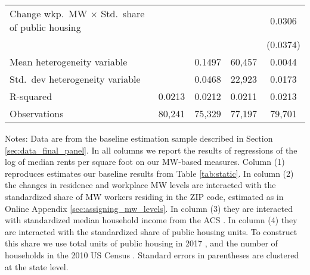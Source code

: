 \begin{table}[hbt!]
\begin{tabular}{@{}lcccc@{}}
        Change wkp.\ MW $\times$ Std.\ share of public housing &        &       &        &  0.0306   \\
                                                               &        &       &        & (0.0374)  \\ \midrule
        Mean heterogeneity variable                            &        & 0.1497   &  60,457  & 0.0044    \\
        Std.\ dev heterogeneity variable                       &        & 0.0468   &  22,923  & 0.0173    \\ \midrule
        R-squared                                              &  0.0213   &  0.0212  &  0.0211   &  0.0213   \\
        Observations                                           &  80,241  &  75,329 &  77,197  &  79,701  \\ \bottomrule
    \end{tabular}

    \begin{minipage}{.95\linewidth} \footnotesize
        \vspace{2mm}
        Notes: 
        Data are from the baseline estimation sample described in Section 
        \ref{sec:data_final_panel}.
        In all columns we report the results of regressions of the log of median 
        rents per square foot on our MW-based measures.
        Column (1) reproduces estimates our baseline results from Table 
        \ref{tab:static}.
        In column (2) the changes in residence and workplace MW levels are 
        interacted with the standardized share of MW workers residing in 
        the ZIP code, estimated as in Online Appendix 
        \ref{sec:assigning_mw_levels}.
        In column (3) they are interacted with standardized median household 
        income from the ACS \parencite{CensusACS}.
        In column (4) they are interacted with the standardized share of 
        public housing units.
        To construct this share we use total units of public housing in 2017 
        \parencite{hudHousing}, and the number of households in the 2010
        US Census \parencite{CensusDecennial}.
        Standard errors in parentheses are clustered at the state level.
    \end{minipage}
\end{table}
